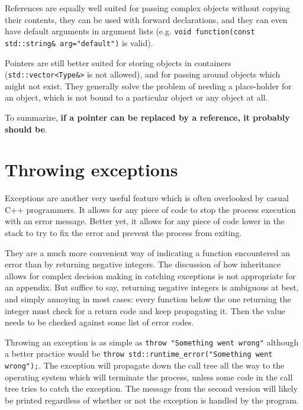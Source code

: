 \documentclass[10pt,a4paper]{book}
\begin{document}
References are equally well suited for passing complex objects without copying their contents, they can be used with forward declarations, and they can even have default arguments in argument lists (e.g. \Verb`void function(const std::string& arg="default")` is valid).

Pointers are still better suited for storing objects in containers (\Verb`std::vector<Type&>` is not allowed), and for passing around objects which might not exist. They generally solve the problem of needing a place-holder for an object, which is not bound to a particular object or any object at all.

To summarize, \textbf{if a pointer can be replaced by a reference, it probably should be}.

\section{Throwing exceptions}

Exceptions are another very useful feature which is often overlooked by casual C++ programmers. It allows for any piece of code to stop the process execution with an error message. Better yet, it allows for any piece of code lower in the stack to try to fix the error and prevent the process from exiting.

They are a much more convenient way of indicating a function encountered an error than by returning negative integers. The discussion of how inheritance allows for complex decision making in catching exceptions is not appropriate for an appendix. But suffice to say, returning negative integers is ambiguous at best, and simply annoying in most cases: every function below the one returning the integer must check for a return code and keep propagating it. Then the value needs to be checked against some list of error codes.

Throwing an exception is as simple as \Verb`throw "Something went wrong"` although a better practice would be \Verb`throw std::runtime_error("Something went wrong");`. The exception will propagate down the call tree all the way to the operating system which will terminate the process, unless some code in the call tree tries to catch the exception. The message from the second version will likely be printed regardless of whether or not the exception is handled by the program.
\end{document}
